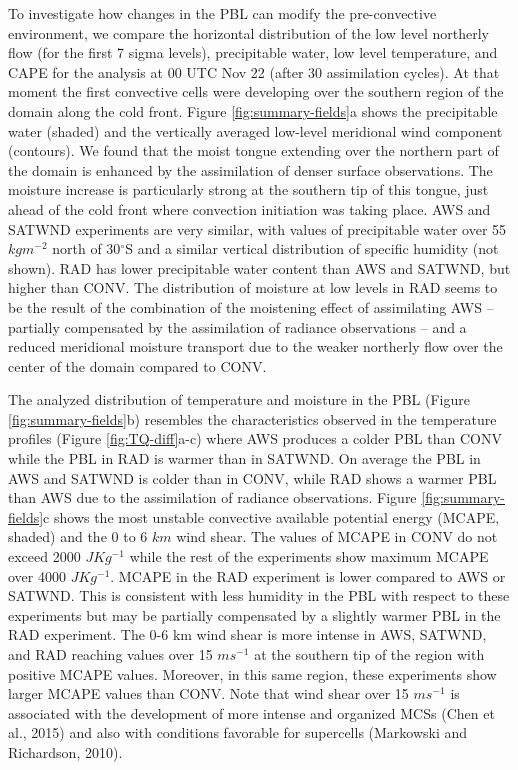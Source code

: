 \documentclass[authoryear,preprint,review,12pt]{elsarticle} %
\begin{document}
To investigate how changes in the PBL can modify the pre-convective environment, we compare the horizontal distribution of the low level northerly flow (for the first 7 sigma levels), precipitable water, low level temperature, and CAPE for the analysis at 00 UTC Nov 22 (after 30 assimilation cycles). At that moment the first convective cells were developing over the southern region of the domain along the cold front. Figure \ref{fig:summary-fields}a shows the precipitable water (shaded) and the vertically averaged low-level meridional wind component (contours). We found that the moist tongue extending over the northern part of the domain is enhanced by the assimilation of denser surface observations. The moisture increase is particularly strong at the southern tip of this tongue, just ahead of the cold front where convection initiation was taking place. AWS and SATWND experiments are very similar, with values of precipitable water over 55 \(kgm^{-2}\) north of 30\(^{\circ}\)S and a similar vertical distribution of specific humidity (not shown). RAD has lower precipitable water content than AWS and SATWND, but higher than CONV. The distribution of moisture at low levels in RAD seems to be the result of the combination of the moistening effect of assimilating AWS -- partially compensated by the assimilation of radiance observations -- and a reduced meridional moisture transport due to the weaker northerly flow over the center of the domain compared to CONV.

The analyzed distribution of temperature and moisture in the PBL (Figure \ref{fig:summary-fields}b) resembles the characteristics observed in the temperature profiles (Figure \ref{fig:TQ-diff}a-c) where AWS produces a colder PBL than CONV while the PBL in RAD is warmer than in SATWND. On average the PBL in AWS and SATWND is colder than in CONV, while RAD shows a warmer PBL than AWS due to the assimilation of radiance observations. Figure \ref{fig:summary-fields}c shows the most unstable convective available potential energy (MCAPE, shaded) and the 0 to 6 \(km\) wind shear. The values of MCAPE in CONV do not exceed 2000 \(JKg^{-1}\) while the rest of the experiments show maximum MCAPE over 4000 \(JKg^{-1}\). MCAPE in the RAD experiment is lower compared to AWS or SATWND. This is consistent with less humidity in the PBL with respect to these experiments but may be partially compensated by a slightly warmer PBL in the RAD experiment. The 0-6 km wind shear is more intense in AWS, SATWND, and RAD reaching values over 15 \(ms^{-1}\) at the southern tip of the region with positive MCAPE values. Moreover, in this same region, these experiments show larger MCAPE values than CONV. Note that wind shear over 15 \(ms^{-1}\) is associated with the development of more intense and organized MCSs (Chen et al., 2015) and also with conditions favorable for supercells (Markowski and Richardson, 2010).
\end{document}
